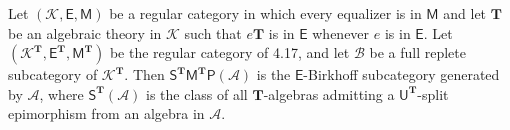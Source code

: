 Let $(\mathcal{K}, \mathsf{E}, \mathsf{M})$ be a regular category in which every equalizer is in $\mathsf{M}$ and let $\mathbf{T}$ be an algebraic theory in $\mathcal{K}$ such that $e\mathbf{T}$ is in $\mathsf{E}$ whenever $e$ is in $\mathsf{E}$. Let $(\mathcal{K}^{\mathbf{T}}, \mathsf{E}^{\mathbf{T}}, \mathsf{M}^{\mathbf{T}})$ be the regular category of 4.17, and let $\mathcal{B}$ be a full replete subcategory of $\mathcal{K}^{\mathbf{T}}$. Then $\mathsf{S}^{\mathbf{T}}\mathsf{M}^{\mathbf{T}}\mathsf{P}(\mathcal{A})$ is the $\mathsf{E}$-Birkhoff subcategory generated by $\mathcal{A}$, where $\mathsf{S}^{\mathbf{T}}(\mathcal{A})$ is the class of all $\mathbf{T}$-algebras admitting a $\mathsf{U}^{\mathbf{T}}$-split epimorphism from an algebra in $\mathcal{A}$.

